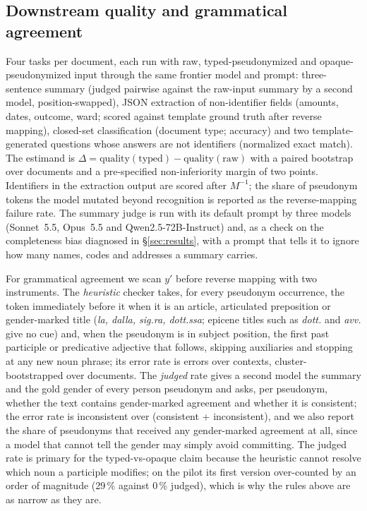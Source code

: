 \documentclass[11pt,a4paper]{article}
\begin{document}
\subsection{Downstream quality and grammatical agreement}
\label{sec:downstream}
Four tasks per document, each run with raw, typed-pseudonymized and opaque-pseudonymized input through the same frontier model and prompt: three-sentence summary (judged pairwise against the raw-input summary by a second model, position-swapped), JSON extraction of non-identifier fields (amounts, dates, outcome, ward; scored against template ground truth after reverse mapping), closed-set classification (document type; accuracy) and two template-generated questions whose answers are not identifiers (normalized exact match). The estimand is $\Delta=\text{quality}(\text{typed})-\text{quality}(\text{raw})$ with a paired bootstrap over documents and a pre-specified non-inferiority margin of two points. Identifiers in the extraction output are scored after $M^{-1}$; the share of pseudonym tokens the model mutated beyond recognition is reported as the reverse-mapping failure rate. The summary judge is run with its default prompt by three models (Sonnet~5.5, Opus~5.5 and Qwen2.5-72B-Instruct) and, as a check on the completeness bias diagnosed in \S\ref{sec:results}, with a prompt that tells it to ignore how many names, codes and addresses a summary carries.

For grammatical agreement we scan $y'$ before reverse mapping with two instruments. The \emph{heuristic} checker takes, for every pseudonym occurrence, the token immediately before it when it is an article, articulated preposition or gender-marked title (\emph{la, dalla, sig.ra, dott.ssa}; epicene titles such as \emph{dott.} and \emph{avv.} give no cue) and, when the pseudonym is in subject position, the first past participle or predicative adjective that follows, skipping auxiliaries and stopping at any new noun phrase; its error rate is errors over contexts, cluster-bootstrapped over documents. The \emph{judged} rate gives a second model the summary and the gold gender of every person pseudonym and asks, per pseudonym, whether the text contains gender-marked agreement and whether it is consistent; the error rate is inconsistent over (consistent + inconsistent), and we also report the share of pseudonyms that received any gender-marked agreement at all, since a model that cannot tell the gender may simply avoid committing. The judged rate is primary for the typed-vs-opaque claim because the heuristic cannot resolve which noun a participle modifies; on the pilot its first version over-counted by an order of magnitude (29\,\% against 0\,\% judged), which is why the rules above are as narrow as they are.
\end{document}
